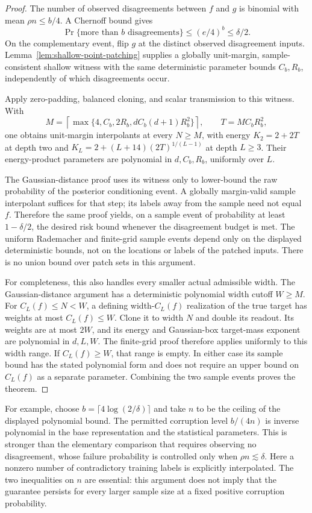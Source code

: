 \begin{proof}
The number of observed disagreements between $f$ and $g$ is binomial with
mean $\rho n\le b/4$. A Chernoff bound gives
\[
 \Pr\{\text{more than }b\text{ disagreements}\}
 \le(e/4)^b\le\delta/2.
\]
On the complementary event, flip $g$ at the distinct observed disagreement
inputs. Lemma~\ref{lem:shallow-point-patching} supplies a globally
unit-margin, sample-consistent shallow witness with the same deterministic
parameter bounds $C_b,R_b$, independently of which disagreements occur.

Apply zero-padding, balanced cloning, and scalar transmission to this
witness. With
\[
 M=\left\lceil\max\{4,C_b,2R_b,dC_b(d+1)R_b^2\}\right\rceil,
 \qquad T=MC_bR_b^2,
\]
one obtains unit-margin interpolants at every $N\ge M$, with energy
$K_2=2+2T$ at depth two and
$K_L=2+(L+14)(2T)^{1/(L-1)}$ at depth $L\ge3$.
Their energy-product parameters are polynomial in $d,C_b,R_b$, uniformly
over $L$.

The Gaussian-distance proof uses its witness only to lower-bound the raw
probability of the posterior conditioning event. A globally margin-valid
sample interpolant suffices for that step; its labels away from the sample
need not equal $f$. Therefore the same proof yields, on a sample event of
probability at least $1-\delta/2$, the desired risk bound whenever the
disagreement budget is met. The uniform Rademacher and finite-grid sample
events depend only on the displayed deterministic bounds, not on the
locations or labels of the patched inputs. There is no union bound over
patch sets in this argument.

For completeness, this also handles every smaller actual admissible width.
The Gaussian-distance argument has a deterministic polynomial width cutoff
$W\ge M$. For $C_L(f)\le N<W$, a defining width-$C_L(f)$ realization of
the true target has weights at most $C_L(f)\le W$. Clone it to width $N$
and double its readout. Its weights are at most $2W$, and its energy and
Gaussian-box target-mass exponent are polynomial in $d,L,W$.
The finite-grid proof therefore applies uniformly to this width range.
If $C_L(f)\ge W$, that range is empty. In either case its sample bound has
the stated polynomial form and does not require an upper bound on
$C_L(f)$ as a separate parameter. Combining the two sample events proves
the theorem.
\end{proof}

For example, choose $b=\lceil4\log(2/\delta)\rceil$ and take $n$ to be
the ceiling of the displayed polynomial bound. The permitted corruption
level $b/(4n)$ is inverse polynomial in the base representation and the
statistical parameters. This is stronger than the elementary comparison
that requires observing no disagreement, whose failure probability is
controlled only when $\rho n\lesssim\delta$. Here a nonzero number of
contradictory training labels is explicitly interpolated.
The two inequalities on $n$ are essential: this argument does not imply
that the guarantee persists for every larger sample size at a fixed
positive corruption probability.
